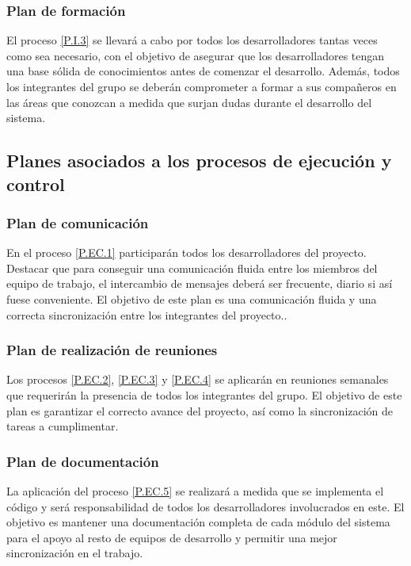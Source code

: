 \documentclass{article}
\begin{document}
\subsubsection{Plan de formación} \label{PL.I.3}

El proceso \ref{P.I.3} se llevará a cabo por todos los desarrolladores tantas veces como sea necesario, con el objetivo de asegurar que los desarrolladores tengan una base sólida de conocimientos antes de comenzar el desarrollo. Además, todos los integrantes del grupo se deberán comprometer a formar a sus compañeros en las áreas que conozcan a medida que surjan dudas durante el desarrollo del sistema.

\subsection{Planes asociados a los procesos de ejecución y control}

\subsubsection{Plan de comunicación} \label{PL.EC.1}

En el proceso \ref{P.EC.1} participarán todos los desarrolladores del proyecto. Destacar que para conseguir una comunicación fluida entre los miembros del equipo de trabajo, el intercambio de mensajes deberá ser frecuente, diario si así fuese conveniente. El objetivo de este plan es una comunicación fluida y una correcta sincronización entre los integrantes del proyecto..

\subsubsection{Plan de realización de reuniones} \label{PL.EC.2} %

Los procesos \ref{P.EC.2}, \ref{P.EC.3} y \ref{P.EC.4} se aplicarán en reuniones semanales que requerirán la presencia de todos los integrantes del grupo. El objetivo de este plan es garantizar el correcto avance del proyecto, así como la sincronización de tareas a cumplimentar.

\subsubsection{Plan de documentación} \label{PL.EC.3}

La aplicación del proceso \ref{P.EC.5} se realizará a medida que se implementa el código y será responsabilidad de todos los desarrolladores involucrados en este. El objetivo es mantener una documentación completa de cada módulo del sistema para el apoyo al resto de equipos de desarrollo y permitir una mejor sincronización en el trabajo.
\end{document}

